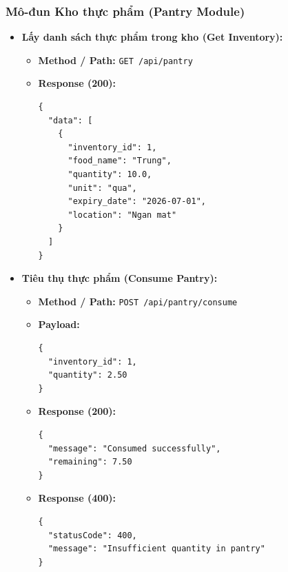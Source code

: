 \documentclass[../main.tex]{subfiles}
\begin{document}
\subsubsection{Mô-đun Kho thực phẩm (Pantry Module)}
\begin{itemize}[leftmargin=*]
    \item \textbf{Lấy danh sách thực phẩm trong kho (Get Inventory):}
    \begin{itemize}
        \item \textbf{Method / Path:} \texttt{GET /api/pantry}
        \item \textbf{Response (200):}
\begin{lstlisting}[style=jsonstyle]
{
  "data": [
    {
      "inventory_id": 1,
      "food_name": "Trung",
      "quantity": 10.0,
      "unit": "qua",
      "expiry_date": "2026-07-01",
      "location": "Ngan mat"
    }
  ]
}
\end{lstlisting}
    \end{itemize}
    \item \textbf{Tiêu thụ thực phẩm (Consume Pantry):}
    \begin{itemize}
        \item \textbf{Method / Path:} \texttt{POST /api/pantry/consume}
        \item \textbf{Payload:}
\begin{lstlisting}[style=jsonstyle]
{
  "inventory_id": 1,
  "quantity": 2.50
}
\end{lstlisting}
        \item \textbf{Response (200):}
\begin{lstlisting}[style=jsonstyle]
{
  "message": "Consumed successfully",
  "remaining": 7.50
}
\end{lstlisting}
        \item \textbf{Response (400):}
\begin{lstlisting}[style=jsonstyle]
{
  "statusCode": 400,
  "message": "Insufficient quantity in pantry"
}
\end{lstlisting}
    \end{itemize}
\end{itemize}
\end{document}
